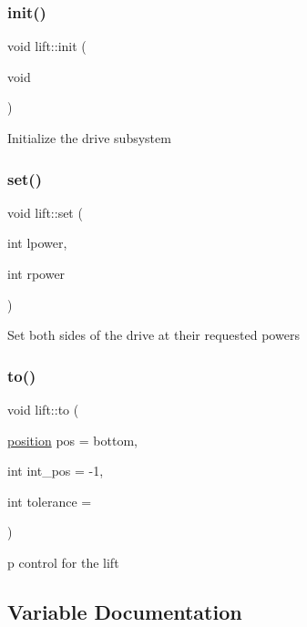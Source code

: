 \subsubsection{\texorpdfstring{init()}{init()}}
{\footnotesize\ttfamily void lift\+::init (\begin{DoxyParamCaption}\item[{void}]{ }\end{DoxyParamCaption})}

Initialize the drive subsystem \mbox{\label{namespacelift_ac4499bdf3cd48c060118c4cbea45ff1c}} 
\subsubsection{\texorpdfstring{set()}{set()}}
{\footnotesize\ttfamily void lift\+::set (\begin{DoxyParamCaption}\item[{int}]{lpower,  }\item[{int}]{rpower }\end{DoxyParamCaption})}

Set both sides of the drive at their requested powers \mbox{\label{namespacelift_adf7c70b4641f006e65b0212780ba0ae8}} 
\subsubsection{\texorpdfstring{to()}{to()}}
{\footnotesize\ttfamily void lift\+::to (\begin{DoxyParamCaption}\item[{\hyperlink{namespacelift_a4a1c349e765b3b8489da50822876099d}{position}}]{pos = {\ttfamily bottom},  }\item[{int}]{int\+\_\+pos = {\ttfamily -\/1},  }\item[{int}]{tolerance = {} }\end{DoxyParamCaption})}

p control for the lift 

\subsection{Variable Documentation}
\mbox{\label{namespacelift_acbf81adbb531b3d3f6d5b1ef946c81f7}} 
